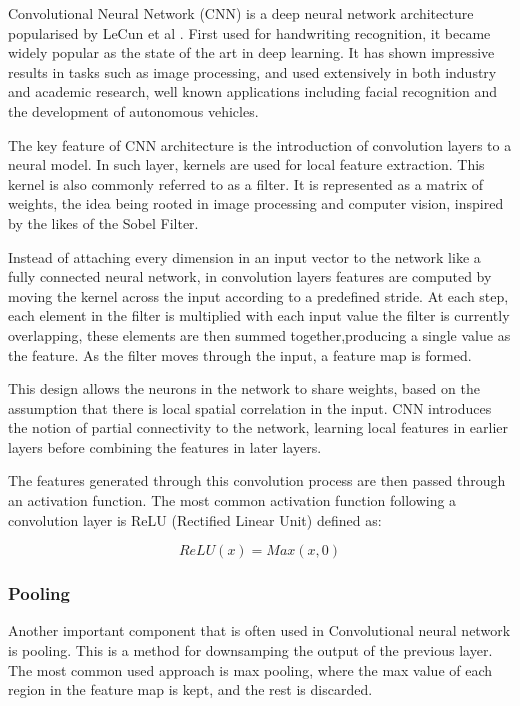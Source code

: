 Convolutional Neural Network (CNN) is a deep neural network architecture popularised by LeCun et al \cite{lecun1989backpropagation}.  First used for handwriting recognition, it became widely popular as the state of the art in deep learning. It has shown impressive results in tasks such as image processing, and used extensively in both industry and academic research, well known applications including facial recognition and the development of autonomous vehicles.

The key feature of CNN architecture is the introduction of convolution layers to a neural model. In such layer, kernels are used for local feature extraction. This kernel is also commonly referred to as a filter. It is represented as a matrix of weights, the idea being rooted in image processing and computer vision, inspired by the likes of the Sobel Filter.

 Instead of attaching every dimension in an input vector to the network like a fully connected neural network, in convolution layers features are computed by moving the kernel across the input according to a predefined stride. At each step, each element in the filter is multiplied with each input value the filter is currently overlapping, these elements are then summed together,producing a single value as the feature. As the filter moves through the input, a feature map is formed.
 
 
 This design allows the neurons in the network to share weights, based on the assumption that there is local spatial correlation in the input. CNN introduces the notion of partial connectivity to the network, learning local features in earlier layers before combining the features in later layers.

The features generated through this convolution process are then passed through an activation function. The most common activation function following a convolution layer is ReLU (Rectified Linear Unit) defined as:

\begin{equation}
	ReLU(x) = Max(x,0)
\end{equation}




\subsubsection{Pooling}
Another important component that is often used in Convolutional neural network is pooling. This is a method for downsamping the output of the previous layer. The most common used approach is max pooling, where the max value of each region in the feature map is kept, and the rest is discarded. 


